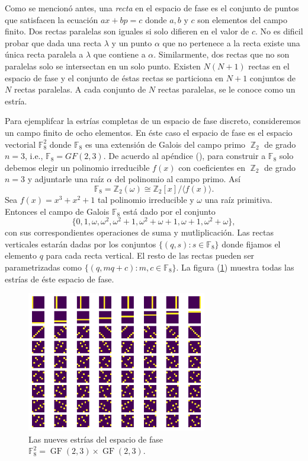 \documentclass[a4paper]{report}
\DeclareMathOperator{\Z}{\mathbb{Z}}
\DeclareMathOperator{\GF}{GF}
\begin{document}
  Como se mencionó antes, una \textit{recta} en el espacio
  de fase es el conjunto de puntos que satisfacen la
  ecuación $ax + bp = c$ donde $a,b$ y $c$ son elementos del
  campo finito. Dos rectas paralelas son iguales si solo
  difieren en el valor de $c$.  No es dificil probar que
  dada una recta $\lambda$ y un punto $\alpha$ que no
  pertenece a la recta existe una única recta paralela a
  $\lambda$ que contiene a $\alpha$.  Similarmente, dos
  rectas que no son paralelas solo se intersectan en un solo
  punto. Existen $N(N+1)$ rectas en el espacio de fase y el
  conjunto de éstas rectas se particiona en $N+1$ conjuntos
  de $N$ rectas paralelas. A cada conjunto de $N$ rectas
  paralelas, se le conoce como un estría. 

  Para ejemplifcar la estrías completas de un espacio de
  fase discreto, consideremos un campo finito de ocho
  elementos. En éste caso el espacio de fase es el espacio
  vectorial $\mathbb F_8^2$ donde $\mathbb F_8$ es una
  extensión de Galois del campo primo $\Z_2$ de grado $n =
  3$, i.e., $\mathbb F_8 = GF(2,3)$.  De acuerdo al apéndice
  (), para construir a $\mathbb F_8$ solo debemos elegir un
  polinomio irreducible $f(x)$ con coeficientes en $\Z_2$ de
  grado $n = 3$ y adjuntarle una raíz $\alpha$ del polinomio
  al campo primo. Así
  \[
    \mathbb F_8
    = \mathbb Z_2(\omega)
    \cong \mathbb Z_2[x] / \langle f(x) \rangle.
  \] 
  Sea $f(x) = x^3+x^2+1$ tal polinomio irreducible y
  $\omega$ una raíz primitiva. Entonces el campo de Galois
  $\mathbb F_8$ está dado por el conjunto 
  \[
    \{0,1,\omega,\omega^2,\omega^2+1,\omega^2+\omega+1,
    \omega+1,\omega^2+\omega\},
  \] 
  con sus correspondientes operaciones de suma y
  mutliplicación. Las rectas verticales estarán dadas por
  los conjuntos $\{(q,s) : s \in \mathbb F_8\}$ donde
  fijamos el elemento $q$ para cada recta vertical. El resto
  de las rectas pueden ser parametrizadas como $\{(q,mq+c) :
  m, c \in \mathbb F_8\}$. La figura (\ref{fig:GF-2-3})
  muestra todas las estrías de éste espacio de fase.

  \begin{figure}[ht]
    \centering
    \includegraphics[width=0.7\textwidth]{imgs/GF23.png}
    \caption{Las nueves estrías del espacio de fase $\mathbb
    F_8^2 = \GF(2,3) \times \GF(2,3)$.}
    \label{fig:GF-2-3}
  \end{figure}
\end{document}
